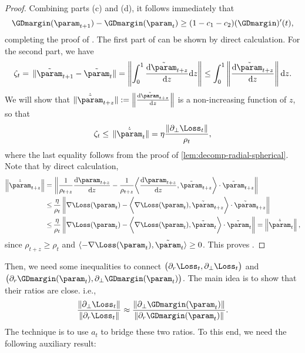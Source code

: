\begin{proof}
Combining parts (c) and (d), it follows immediately that
\begin{equation*}
    \GDmargin (\param_{t+1}) - \GDmargin (\param_t) \ge (1 - c_1 - c_2) (\GDmargin)' (t),
\end{equation*}
completing the proof of . The first part of  can be shown by direct calculation. For the second part, we have
\begin{align*}
    \zeta_t = \, \| \tilde{\param}_{t+1} - \tilde{\param}_t \| = \left\| \int_{0}^{1} \frac{\mathrm{d} \tilde{\param}_{t+z} }{\mathrm{d} z } \mathrm{d} z \right\| \le \int_{0}^{1} \left\| \frac{\mathrm{d} \tilde{\param}_{t+z} }{\mathrm{d} z } \right\| \mathrm{d} z.
\end{align*}
We will show that $\| \dot{\tilde{\param}}_{t+z} \| := \left\| \frac{\mathrm{d} \tilde{\param}_{t+z} }{\mathrm{d} z } \right\|$ is a non-increasing function of $z$, so that
\begin{equation*}
    \zeta_t \le \, \| \dot{\tilde{\param}}_t \| = \eta \frac{\| \partial_\perp \Loss_t\|}{\rho_t},
\end{equation*}
where the last equality follows from the proof of \cref{lem:decomp-radial-spherical}. Note that by direct calculation,
\begin{align*}
    \left\| \dot{\tilde{\param}}_{t+z} \right\| = \, & \left\| \frac{1}{\rho_{t+z}} \frac{\mathrm{d}  \param_{t + z}}{\mathrm{d} z} - \frac{1}{\rho_{t+z}} \bigg\langle\frac{\mathrm{d} \param_{t + z}}{\mathrm{d} z}, \tilde{\param}_{t+z} \bigg \rangle \cdot \tilde{\param}_{t+z} \right\| \\
    \le \, & \frac{\eta}{\rho_t} \left\| \nabla \Loss (\param_t) - \bigg\langle \nabla \Loss (\param_t), \tilde{\param}_{t+z} \bigg \rangle \cdot \tilde{\param}_{t+z} \right\| \\
    \le \, & \frac{\eta}{\rho_t} \left\| \nabla \Loss (\param_t) - \bigg\langle \nabla \Loss (\param_t), \tilde{\param}_t \bigg \rangle \cdot \tilde{\param}_t \right\| = \left\| \dot{\tilde{\param}}_{t} \right\|,
\end{align*}
since $\rho_{t+z} \ge \rho_t$ and $\langle - \nabla \Loss (\param_t), \tilde{\param}_t \rangle \ge 0$. This proves .
\end{proof}

Then, we need some inequalities to connect $\big( \partial_r \Loss_t, \partial_\perp \Loss_t \big)$ and $\big( \partial_r\GDmargin (\param_t), \partial_\perp \GDmargin (\param_t) \big)$.  The main idea is to show that their ratios are close. i.e., 
\[
    \frac{\| \partial_\perp \Loss_t\|}{\| \partial_r \Loss_t\|} \approx \frac{\| \partial_\perp \GDmargin (\param_t)\|}{\| \partial_r \GDmargin (\param_t)\|}.
\] 
The technique is to use $a_t$ to bridge these two ratios. To this end, we need the following auxiliary result:

